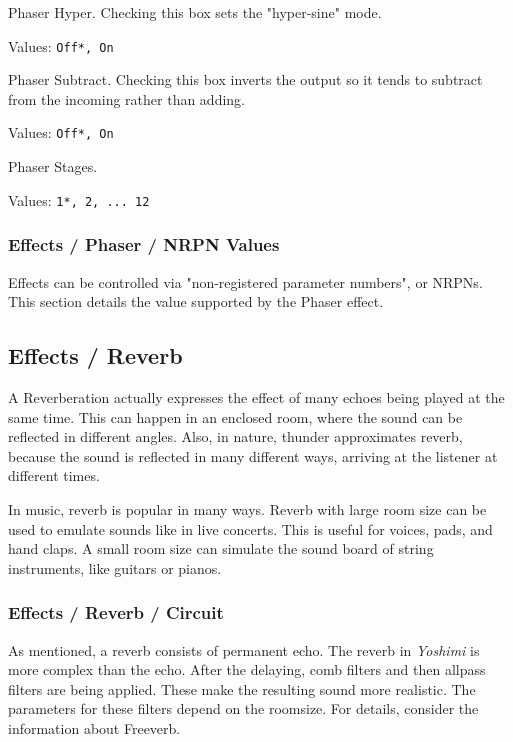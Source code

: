    Phaser Hyper.
   Checking this box sets the "hyper-sine" mode.

   Values: \texttt{Off*, On}

   Phaser Subtract.
   Checking this box inverts the output so it tends to subtract from the incoming rather than adding.

   Values: \texttt{Off*, On}

   Phaser Stages.

   Values: \texttt{1*, 2, ... 12}

\subsubsection{Effects / Phaser / NRPN Values}
\label{subsubsec:effects_edit_phaser_nrpn}

Effects can be controlled via "non-registered parameter numbers", or NRPNs.
This section details the value supported by the Phaser effect.

\subsection{Effects / Reverb}
\label{subsec:effects_edit_reverb}

   A Reverberation actually expresses the effect of many echoes being played
   at the same time. This can happen in an enclosed room, where the sound can
   be reflected in different angles. Also, in nature, thunder approximates
   reverb, because the sound is reflected in many different ways, arriving
   at the listener at different times.

   In music, reverb is popular in many ways. Reverb with large room size
   can be used to emulate sounds like in live concerts. This is useful for
   voices, pads, and hand claps. A small room size can simulate the sound
   board of string instruments, like guitars or pianos.

\subsubsection{Effects / Reverb / Circuit}
\label{subsubsec:effects_edit_reverb_circuit}

   As mentioned, a reverb consists of permanent echo. The reverb in
   \textsl{Yoshimi} is more complex than the echo. After the delaying, comb
   filters and then allpass filters are being applied. These make the
   resulting sound more realistic. The parameters for these filters depend on
   the roomsize. For details, consider the information about Freeverb.

